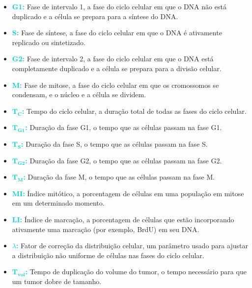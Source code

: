 \documentclass[11pt,a4paper]{article}
\newcounter{exemplo}
\begin{document}
	\begin{itemize}
		\item \textcolor{DarkTurquoise}{\textbf{G1:}} Fase de intervalo 1, a fase do ciclo celular em que o DNA não está duplicado e a célula se prepara para a síntese do DNA.
		\item \textcolor{DarkTurquoise}{\textbf{S:}} Fase de síntese, a fase do ciclo celular em que o DNA é ativamente replicado ou sintetizado.
		\item \textcolor{DarkTurquoise}{\textbf{G2:}} Fase de intervalo 2, a fase do ciclo celular em que o DNA está completamente duplicado e a célula se prepara para a divisão celular.
		\item \textcolor{DarkTurquoise}{\textbf{M:}} Fase de mitose, a fase do ciclo celular em que os cromossomos se condensam, e o núcleo e a célula se dividem.
		\item \textcolor{DarkTurquoise}{\textbf{$\mathbf{\text{T}_\text{C}}$:}} Tempo do ciclo celular, a duração total de todas as fases do ciclo celular.
		\item \textcolor{DarkTurquoise}{\textbf{$\mathbf{\text{T}_\text{G1}}$:}} Duração da fase G1, o tempo que as células passam na fase G1.
		\item \textcolor{DarkTurquoise}{\textbf{$\mathbf{\text{T}_\text{S}}$:}} Duração da fase S, o tempo que as células passam na fase S.
		\item \textcolor{DarkTurquoise}{\textbf{$\mathbf{\text{T}_\text{G2}}$:}} Duração da fase G2, o tempo que as células passam na fase G2.
		\item \textcolor{DarkTurquoise}{\textbf{$\mathbf{\text{T}_\text{M}}$:}} Duração da fase M, o tempo que as células passam na fase M.
		\item \textcolor{DarkTurquoise}{\textbf{MI:}} Índice mitótico, a porcentagem de células em uma população em mitose em um determinado momento.
		\item \textcolor{DarkTurquoise}{\textbf{LI:}} Índice de marcação, a porcentagem de células que estão incorporando ativamente uma marcação (por exemplo, BrdU) em seu DNA.
		\item \textcolor{DarkTurquoise}{\textbf{$\lambda$:}} Fator de correção da distribuição celular, um parâmetro usado para ajustar a distribuição não uniforme de células nas fases do ciclo celular.
		\item \textcolor{DarkTurquoise}{\textbf{$\mathbf{\text{T}_\text{vol}}$:}} Tempo de duplicação do volume do tumor, o tempo necessário para que um tumor dobre de tamanho.

\end{itemize}
\end{document}
